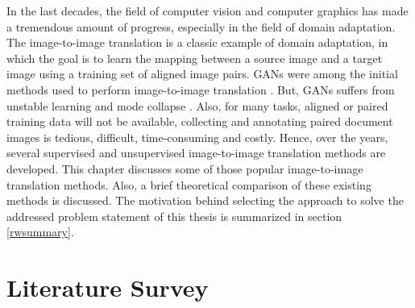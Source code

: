 
\justifying
\setlength{\parskip}{1em}


In the last decades, the field of computer vision and computer graphics has made a tremendous amount of progress, especially in the field of domain adaptation. The image-to-image translation is a classic example of domain adaptation, in which the goal is to learn the mapping between a source image and a target image using a training set of aligned image pairs. \acp{GAN} were among the initial methods used to perform image-to-image translation \cite{pang2021imagetoimage} \cite{goodfellow2014generative}. But, \acp{GAN} suffers from unstable learning and mode collapse \cite{thanhtung2020catastrophic}. Also, for many tasks, aligned or paired training data will not be available, collecting and annotating paired document images is tedious, difficult, time-consuming and costly. Hence, over the years, several supervised and unsupervised image-to-image translation methods are developed. This chapter discusses some of those popular image-to-image translation methods. Also, a brief theoretical comparison of these existing methods is discussed. The motivation behind selecting the approach to solve the addressed problem statement of this thesis is summarized in section \ref{rwsummary}.



\section{Literature Survey}\label{LiteratureSurvey}



